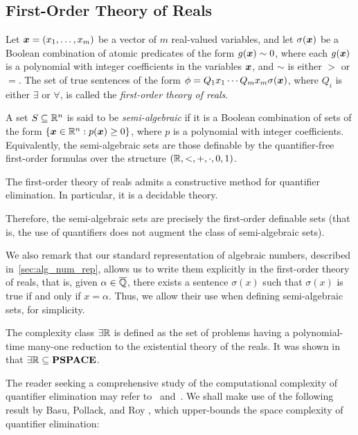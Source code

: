 \subsection{First-Order Theory of Reals}

Let $\boldsymbol{x}=(x_1,\ldots,x_m)$ be a vector of $m$ real-valued
variables, and let $\sigma(\boldsymbol{x})$ be a Boolean combination
of atomic predicates of the form $g(\boldsymbol{x})\sim 0$, where each
$g(\boldsymbol{x})$ is a polynomial with integer coefficients in the
variables $\boldsymbol{x}$, and $\sim$ is either $>$ or $=$.
The set of true sentences of the form $\phi=Q_1 x_1 \cdots Q_m x_m
\sigma(\boldsymbol{x})$, where $Q_i$ is either $\exists$ or
$\forall$, is called the \emph{first-order theory of reals}.

A set $S \subseteq \mathbb{R}^{n}$ is said to be \emph{semi-algebraic} if it is a Boolean combination of sets of the form $\lbrace \boldsymbol{x} \in \mathbb{R}^{n}: p(\boldsymbol{x}) \geq 0\rbrace$, where $p$ is a polynomial with integer coefficients. Equivalently, the semi-algebraic sets are those definable by the quantifier-free first-order formulas over the structure $(\mathbb{R}, <, +, \cdot, 0, 1)$.

\begin{theorem}
  \label{thm:tarski}
  The first-order theory of reals admits a constructive method for quantifier elimination. In particular, it is a decidable theory.~\cite{Tar51}
\end{theorem}

Therefore, the semi-algebraic sets are precisely the first-order definable sets (that is, the use of quantifiers does not augment the class of semi-algebraic sets).

We also remark that our standard representation of algebraic numbers, described in~\cref{sec:alg_num_rep}, allows us to write them explicitly in the first-order theory of reals, that is, given $\alpha\in\overline{\mathbb{Q}}$, there exists a sentence $\sigma(x)$ such that $\sigma(x)$ is true if and only if $x=\alpha$. Thus, we allow their use when defining semi-algebraic sets, for simplicity.

The complexity class $\exists\mathbb{R}$ is defined as the set of problems having a polynomial-time many-one reduction to the existential theory of the reals. It was shown in~\cite{Canny88} that $\exists\mathbb{R}\subseteq \textbf{PSPACE}$.

The reader seeking a comprehensive study of the computational complexity of quantifier elimination may refer to~\cite{Renegar} and~\cite{BPR06}. We shall make use of the following result by Basu, Pollack, and Roy
\cite{BasuPR96}, which upper-bounds the space complexity of quantifier elimination:

